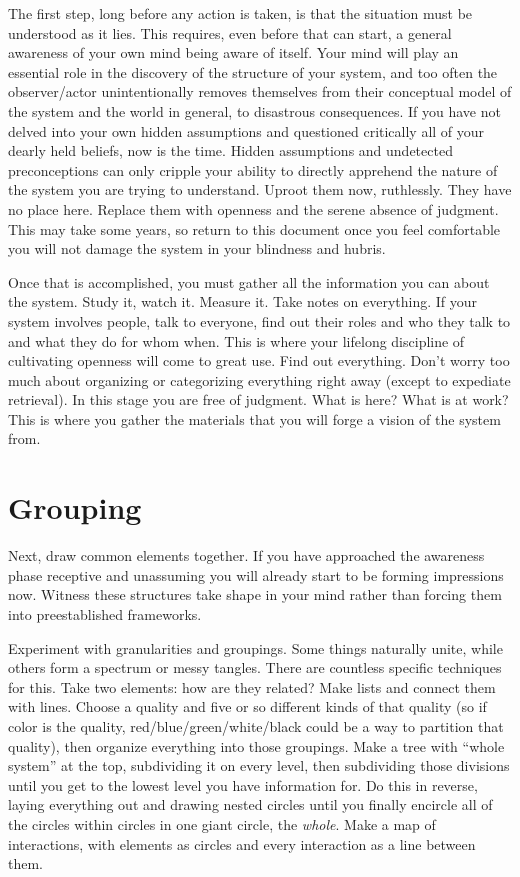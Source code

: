 \documentclass[11pt]{article}
\begin{document}
The first step, long before any action is taken, is that the situation must be understood as it lies.  This requires, even before that can start, a general awareness of your own mind being aware of itself.  Your mind will play an essential role in the discovery of the structure of your system, and too often the observer/actor unintentionally removes themselves from their conceptual model of the system and the world in general, to disastrous consequences.  If you have not delved into your own hidden assumptions and questioned critically all of your dearly held beliefs, now is the time.  Hidden assumptions and undetected preconceptions can only cripple your ability to directly apprehend the nature of the system you are trying to understand.  Uproot them now, ruthlessly.  They have no place here.  Replace them with openness and the serene absence of judgment.  This may take some years, so return to this document once you feel comfortable you will not damage the system in your blindness and hubris.

Once that is accomplished, you must gather all the information you can about the system.  Study it, watch it.  Measure it.  Take notes on everything.  If your system involves people, talk to everyone, find out their roles and who they talk to and what they do for whom when.  This is where your lifelong discipline of cultivating openness will come to great use.  Find out everything.  Don't worry too much about organizing or categorizing everything right away (except to expediate retrieval).  In this stage you are free of judgment.  What is here?  What is at work?  This is where you gather the materials that you will forge a vision of the system from.

\section{Grouping}

Next, draw common elements together.  If you have approached the awareness phase receptive and unassuming you will already start to be forming impressions now.  Witness these structures take shape in your mind rather than forcing them into preestablished frameworks. 

Experiment with granularities and groupings.  Some things naturally unite, while others form a spectrum or messy tangles.  There are countless specific techniques for this.  Take two elements: how are they related?  Make lists and connect them with lines.  Choose a quality and five or so different kinds of that quality (so if color is the quality, red/blue/green/white/black could be a way to partition that quality), then organize everything into those groupings.  Make a tree with ``whole system'' at the top, subdividing it on every level, then subdividing those divisions until you get to the lowest level you have information for.  Do this in reverse, laying everything out and drawing nested circles until you finally encircle all of the circles within circles in one giant circle, the \emph{whole}.  Make a map of interactions, with elements as circles and every interaction as a line between them.  
\end{document}
